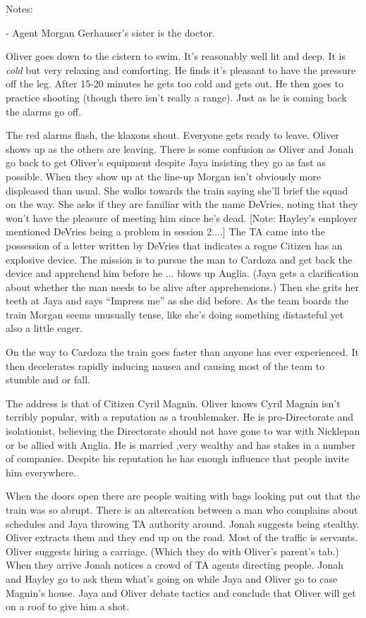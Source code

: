 Notes:

- Agent Morgan Gerhauser's sister is the doctor.



Oliver goes down to the cistern to swim.  It's reasonably well lit and deep.  It is \textit{cold} but very relaxing and comforting.  He finds it's pleasant to have the pressure off the leg.   After 15-20 minutes he gets too cold and gets out.  He then goes to practice shooting (though there isn't really a range).  Just as he is coming back the alarms go off.



The red alarms flash, the klaxons shout.  Everyone gets ready to leave.  Oliver shows up as the others are leaving.  There is some confusion as Oliver and Jonah go back to get Oliver's equipment despite Jaya insisting they go as fast as possible.  When they show up at the line-up Morgan isn't obviously more displeased than usual.  She walks towards the train saying she'll brief the squad on the way.  She asks if they are familiar with the name DeVries, noting that they won't have the pleasure of meeting him since he's dead.  {[}Note: Hayley's employer mentioned DeVries being a problem in session 2....{]}  The TA came into the possession of a letter written by DeVries that indicates a rogue Citizen has an explosive device.  The mission is to pursue the man to Cardoza and get back the device and apprehend him before he ... blows up Anglia.   (Jaya gets a clarification about whether the man needs to be alive after apprehensions.)  Then she grits her teeth at Jaya and says ``Impress me'' as she did before.  As the team boards the train Morgan seems unusually tense, like she's doing something distasteful yet also a little eager.



On the way to Cardoza the train goes faster than anyone has ever experienced.  It then decelerates rapidly inducing nausea and causing most of the team to stumble and or fall.

The address is that of Citizen Cyril Magnin.  Oliver knows Cyril Magnin isn't terribly popular, with a reputation as a troublemaker.  He is pro-Directorate and isolationist, believing the Directorate should not have gone to war with Nicklepan or be allied with Anglia.   He is married ,very wealthy and has stakes in a number of companies.  Despite his reputation he has enough influence that people invite him everywhere.



When the doors open there are people waiting with bags looking put out that the train was so abrupt.  There is an altercation between a man who complains about schedules and Jaya throwing TA authority around.  Jonah suggests being stealthy.  Oliver extracts them and they end up on the road.  Most of the traffic is servants.  Oliver suggests hiring a carriage.  (Which they do with Oliver's parent's tab.)  When they arrive Jonah notices a crowd of TA agents directing people.  Jonah and Hayley go to ask them what's going on while Jaya and Oliver go to case Magnin's house.  Jaya and Oliver debate tactics and conclude that Oliver will get on a roof to give him a shot.



